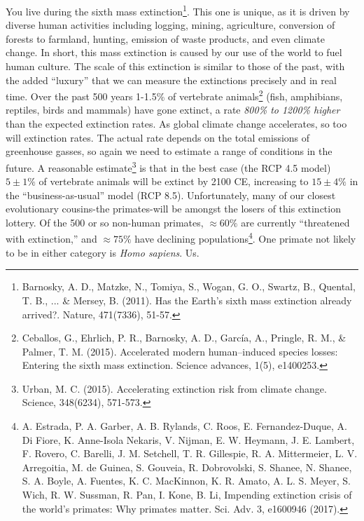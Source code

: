 \documentclass[amstex,12pt]{book}
\begin{document}
You live during the sixth mass extinction\footnote{Barnosky, A. D., Matzke, N., Tomiya, S., Wogan, G. O., Swartz, B., Quental, T. B., ... \& Mersey, B. (2011). Has the Earth's sixth mass extinction already arrived?. Nature, 471(7336), 51-57.}. This one is unique, as it is driven by diverse human activities including logging, mining, agriculture, conversion of forests to farmland, hunting, emission of waste products, and even climate change. In short, this mass extinction is caused by our use of the world to fuel human culture. The scale of this extinction is similar to those of the past, with the added ``luxury'' that we can measure the extinctions precisely and in real time. Over the past 500 years 1-1.5\% of vertebrate animals\footnote{Ceballos, G., Ehrlich, P. R., Barnosky, A. D., García, A., Pringle, R. M., \& Palmer, T. M. (2015). Accelerated modern human–induced species losses: Entering the sixth mass extinction. Science advances, 1(5), e1400253.} (fish, amphibians, reptiles, birds and mammals) have gone extinct, a rate \emph{800\% to 1200\% higher} than the expected extinction rates. As global climate change accelerates, so too will extinction rates. The actual rate depends on the total emissions of greenhouse gasses, so again we need to estimate a range of conditions in the future. A reasonable estimate\footnote{Urban, M. C. (2015). Accelerating extinction risk from climate change. Science, 348(6234), 571-573.} is that in the best case (the RCP 4.5 model) $5 \pm 1\%$ of vertebrate animals will be extinct by 2100 CE, increasing to $15 \pm 4\%$ in the ``business-as-usual'' model (RCP 8.5). Unfortunately, many of our closest evolutionary cousins-the primates-will be amongst the losers of this extinction lottery. Of the 500 or so non-human primates, $\approx 60\%$ are currently ``threatened with extinction,'' and $\approx 75\%$ have declining populations\footnote{A. Estrada, P. A. Garber, A. B. Rylands, C. Roos, E. Fernandez-Duque, A. Di Fiore,
K. Anne-Isola Nekaris, V. Nijman, E. W. Heymann, J. E. Lambert, F. Rovero, C. Barelli,
J. M. Setchell, T. R. Gillespie, R. A. Mittermeier, L. V. Arregoitia, M. de Guinea, S. Gouveia,
R. Dobrovolski, S. Shanee, N. Shanee, S. A. Boyle, A. Fuentes, K. C. MacKinnon, K. R. Amato,
A. L. S. Meyer, S. Wich, R. W. Sussman, R. Pan, I. Kone, B. Li, Impending extinction crisis of
the world’s primates: Why primates matter. Sci. Adv. 3, e1600946 (2017).}. One primate not likely to be in either category is \textit{Homo sapiens}. Us.\\
  
\end{document}
